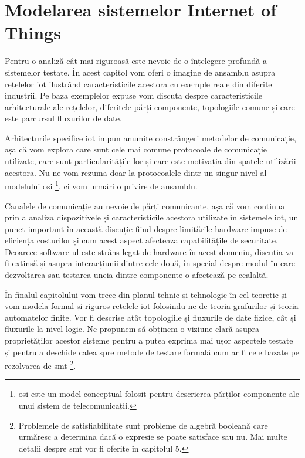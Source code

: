 \chapter{Modelarea sistemelor Internet of Things}

Pentru o analiză cât mai riguroasă este nevoie de o înțelegere profundă a sistemelor testate. În acest capitol vom oferi o imagine de ansamblu asupra rețelelor \acrshort{iot} ilustrând caracteristicile acestora cu exemple reale din diferite industrii. Pe baza exemplelor expuse vom discuta despre caracteristicile arhitecturale ale rețelelor, diferitele părți componente, topologiile comune și care este parcursul fluxurilor de date.

Arhitecturile specifice \acrshort{iot} impun anumite constrângeri metodelor de comunicație, așa că vom explora care sunt cele mai comune protocoale de comunicație utilizate, care sunt particularitățile lor și care este motivația din spatele utilizării acestora. Nu ne vom rezuma doar la protocoalele dintr-un singur nivel al modelului \acrfull{osi} \footnote{\acrshort{osi} este un model conceptual folosit pentru descrierea părților componente ale unui sistem de telecomunicații.}, ci vom urmări o privire de ansamblu.

Canalele de comunicație au nevoie de părți comunicante, așa că vom continua prin a analiza dispozitivele și caracteristicile acestora utilizate în sistemele \acrshort{iot}, un punct important în această discuție fiind despre limitările hardware impuse de eficiența costurilor și cum acest aspect afectează capabilitățile de securitate. Deoarece software-ul este strâns legat de hardware în acest domeniu, discuția va fi extinsă și asupra interacțiunii dintre cele două, în special despre modul în care dezvoltarea sau testarea uneia dintre componente o afectează pe cealaltă.

În finalul capitolului vom trece din planul tehnic și tehnologic în cel teoretic și vom modela formal și riguros rețelele \acrshort{iot} folosindu-ne de teoria grafurilor și teoria automatelor finite. Vor fi descrise atât topologiile și fluxurile de date fizice, cât și fluxurile la nivel logic. Ne propunem să obținem o viziune clară asupra proprietăților acestor sisteme pentru a putea exprima mai ușor aspectele testate și pentru a deschide calea spre metode de testare formală cum ar fi cele bazate pe rezolvarea de \acrfull{smt} \footnote{Problemele de satisfiabilitate sunt probleme de algebră booleană care urmăresc a determina dacă o expresie se poate satisface sau nu. Mai multe detalii despre \acrshort{smt} vor fi oferite în capitolul 5.}.

